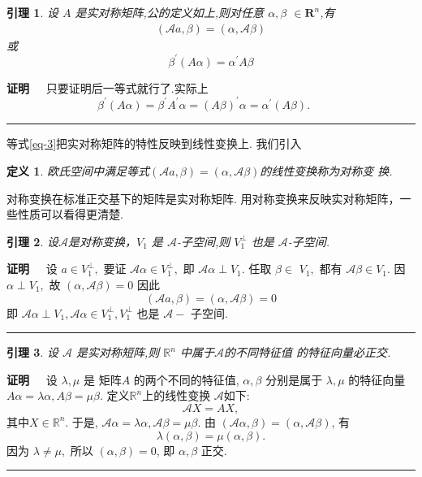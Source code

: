\documentclass[13pt]{beamer}
\newtheorem{lem}{引理}
\newtheorem*{defi}{定义}
\def\qed{\nopagebreak\hfill{\rule{4pt}{7pt}}\medbreak}
\def\pf{{\bf 证明~~ }}
\def\Rn{\mathbb{R}^n}
\def\A{\mathscr{A}}
\begin{document}
\begin{frame}
\begin{lem}
设 $A$ 是实对称矩阵,公的定义如上,则对任意 ${\alpha}, {\beta}$ $\in \mathbf{R}^{n}$,有
\begin{align}\label{eq-3}
(\mathscr{A} {a}, {\beta})=({\alpha}, \mathscr{A} {\beta})
\end{align}
或
\[
{\beta}^{\prime}({A} {\alpha})={\alpha}^{\prime} {A} {\beta}
\]
\end{lem}
\pf 只要证明后一等式就行了.实际上\\
$\qquad \qquad \qquad \qquad 
{\beta}^{\prime}({A} {\alpha})={\beta}^{\prime} {A}^{\prime} {\alpha}=({A} {\beta})^{\prime} {\alpha}={\alpha}^{\prime}({A} {\beta}).
$
\qed 
等式\eqref{eq-3}把实对称矩阵的特性反映到线性变换上. 我们引入
\begin{defi}
欧氏空间中满足等式$(\mathscr{A} {a}, {\beta})=({\alpha}, \mathscr{A} {\beta})$的线性变换称为对称变
换. 
\end{defi}
对称变换在标准正交基下的矩阵是实对称矩阵. 
用对称变换来反映实对称矩阵，一些性质可以看得更清楚.
\end{frame}


\begin{frame}
\begin{lem}
设$\mathscr{A}$是对称变换，$V_1$ 是 $\mathscr{A}$-子空间,则 $V_{1}^{\perp}$ 也是
$\mathscr{A}$-子空间. 
\end{lem}

\pf 
设 ${a} \in V_{1}^{\perp},$ 要证 $\mathscr{A} {\alpha} \in V_{1}^{\perp},$ 即 $\mathscr{A} {\alpha} \perp V_{1} .$ 任取 ${\beta} \in$
$V_{1},$ 都有 $\mathscr{A} {\beta} \in V_{1} .$ 因 ${\alpha} \perp V_{1},$ 故 $({\alpha}, \mathscr{A} {\beta})=0$
因此
\[
(\mathscr{A} {a}, {\beta})=({\alpha}, \mathscr{A} {\beta})=0
\]
即 $\mathscr{A} {\alpha} \perp V_{1}, \mathscr{A} {\alpha} \in V_{1}^{\perp}, V_{1}^{\perp}$ 也是 $\mathscr{A}-$ 子空间.
\qed
\end{frame}

\begin{frame}
\begin{lem}
设 $\mathscr{A} $ 是实对称短阵,则 $\Rn$ 中属于$\mathscr{A} $的不同特征值 的特征向量必正交.
\end{lem}
\pf 
设 $\lambda, \mu$ 是 矩阵$A$ 的两个不同的特征值, ${\alpha}, {\beta}$ 分别是属于
$\lambda, \mu$ 的特征向量 $ A {\alpha}=\lambda {\alpha}, {A} {\beta}=\mu {\beta}$. 
定义$\Rn$上的线性变换 $\A$如下: $$\A X=AX,$$ 其中$X \in \Rn$. 
于是,
$\mathscr{A} {\alpha}=\lambda {\alpha}, \mathscr{A} {\beta}=\mu {\beta}$.
由 $(\mathscr{A} {\alpha}, {\beta})=({\alpha}, \mathscr{A} {\beta})$, 有
\[
\lambda({\alpha}, {\beta})=\mu({\alpha}, {\beta}).
\]
因为 $\lambda \neq \mu,$ 所以 $({\alpha}, {\beta})=0$, 即 ${\alpha}, {\beta}$ 正交.
\qed
\end{frame}
\end{document}
